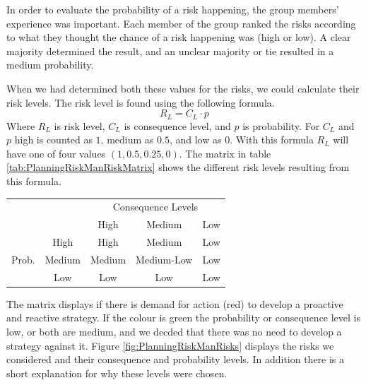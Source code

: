 In order to evaluate the probability of a risk happening, the group members' experience was important. Each member of the group ranked the risks according to what they thought the chance of a risk happening was (high or low). A clear majority determined the result, and an unclear majority or tie resulted in a medium probability.


When we had determined both these values for the risks, we could calculate their risk levels. The risk level is found using the following formula.
\begin{equation}
R_L = C_L \cdot p
\end{equation}
Where \( R_L \) is risk level, \( C_L \) is consequence level, and \( p \) is probability. For \( C_L \) and \( p \) high is counted as \( 1 \), medium as \( 0.5 \), and low as \( 0 \). With this formula \( R_L \) will have one of four values \( (1, 0.5, 0.25, 0) \). The matrix in table \ref{tab:PlanningRiskManRiskMatrix} shows the different risk levels resulting from this formula.

\begin{minipage}{\linewidth}
\centering
\begin{tabular}{cc|c|c|c| }
  \cline{3-5}
  & & \multicolumn{3}{|c|}{Consequence Levels} \\ \cline{3-5}
  & & High & Medium & Low \\ \hline
  \multicolumn{1}{|c}{\multirow{3}{*}{Prob.}} & \multicolumn{1}{|c|}{High} & \cellcolor{red!30} High & \cellcolor{red!30} Medium & \cellcolor{green!15} Low \\ \cline{2-5}
  \multicolumn{1}{|c}{} & \multicolumn{1}{|c|}{Medium} & \cellcolor{red!30} Medium & \cellcolor{green!15} Medium-Low & \cellcolor{green!15} Low \\ \cline{2-5}
  \multicolumn{1}{|c}{} & \multicolumn{1}{|c|}{Low} & \cellcolor{green!15} Low & \cellcolor{green!15} Low & \cellcolor{green!15} Low \\ \cline{2-5}
  \hline
\end{tabular}
\end{minipage}

The matrix displays if there is demand for action (red) to develop a proactive and reactive strategy. If the colour is green the probability or consequence level is low, or both are medium, and we decded that there was no need to develop a strategy against it. Figure \ref{fig:PlanningRiskManRisks} displays the risks we considered and their consequence and probability levels. In addition there is a short explanation for why these levels were chosen.

